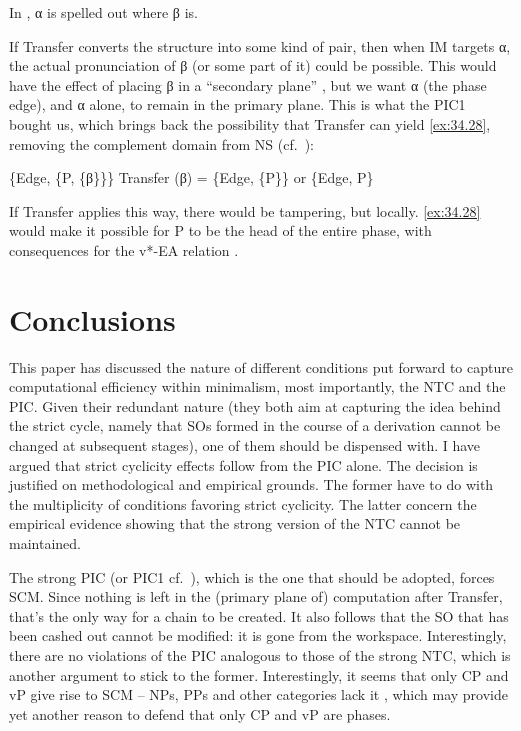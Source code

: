\documentclass[output=paper]{langsci/langscibook}
\begin{document}
\ea%
    \label{ex:34.27}
    In , α is spelled out where β is. \parencite[199]{Chomsky2004}
\z

If Transfer converts the structure into some kind of pair, then when \gls{IM}
targets α, the actual pronunciation of β (or some part of it) could be
possible.  This would have the effect of placing β in a “secondary plane”
\citep{Chomsky2004}, but we want α (the phase edge), and α alone, to
remain in the primary plane.  This is what the PIC1 bought us, which brings
back the possibility that Transfer can yield \eqref{ex:34.28}, removing the
complement domain from \gls{NS} (cf.~\cite{Ott2011}):

\ea%
    \label{ex:34.28}
	\ea \{Edge, \{P, \{β\}\}\}
	\ex Transfer (β) = \{Edge, \{P\}\} or \{Edge, P\}
	\z
\z

If Transfer applies this way, there would be tampering, but locally. \eqref{ex:34.28} would
make it possible for P to be the head of the entire phase, with consequences
for the v*-\gls{EA} relation \parencite[cf.][]{EpShim2015}.

\section{Conclusions}\label{sec:34.5}

This paper has discussed the nature of different conditions put forward to
capture computational efficiency within minimalism, most importantly, the
\gls{NTC} and the \gls{PIC}. Given their redundant nature (they both aim at
capturing the idea behind the strict cycle, namely that \glspl{SO} formed in
the course of a derivation cannot be changed at subsequent stages), one of them
should be dispensed with.  I have argued that strict cyclicity effects follow
from the \gls{PIC} alone. The decision is justified on methodological and
empirical grounds. The former have to do with the multiplicity of conditions
favoring strict cyclicity. The latter concern the empirical evidence showing
that the strong version of the \gls{NTC} cannot be maintained.

The strong \gls{PIC} (or PIC1 cf.~\citealt{Chomsky2000}), which is the one that
should be adopted, forces \gls{SCM}. Since nothing is left in the (primary
plane of) computation after Transfer, that’s the only way for a chain to be
created. It also follows that the \gls{SO} that has been cashed out cannot be
modified: it is gone from the workspace. Interestingly, there are no violations
of the \gls{PIC} analogous to those of the strong \gls{NTC}, which is another
argument to stick to the former. Interestingly, it seems that only CP and vP
give rise to SCM -- NPs, PPs and other categories lack it
\parencite[cf.][]{Gallego2012,vanUrk2016}, which may provide yet another reason
to defend that only CP and vP are phases.
\end{document}
